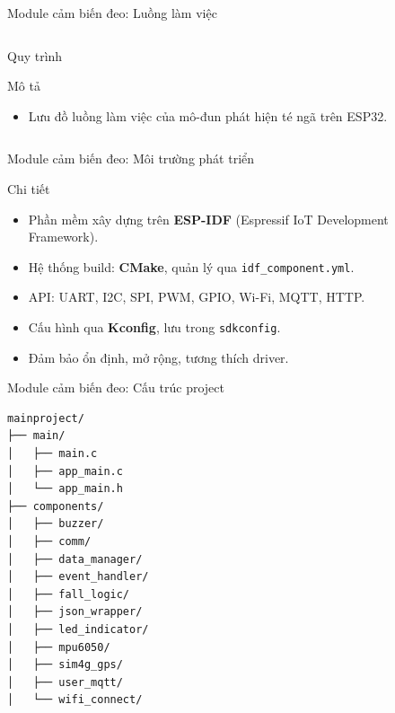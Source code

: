 \begin{frame}[fragile]{Module cảm biến đeo: Luồng làm việc}
\begin{columns}[t]
\begin{column}{0.4\textwidth}
\begin{block}{Quy trình}
\begin{itemize}
                \end{itemize}
            \end{block}
            \begin{block}{Mô tả}
                \begin{itemize}
                    \item Lưu đồ luồng làm việc của mô-đun phát hiện té ngã trên ESP32.
                \end{itemize}
            \end{block}
            \label{fig:module1_flow}
        \end{column}
    \end{columns}
\end{frame}


\begin{frame}{Module cảm biến đeo: Môi trường phát triển}
    \begin{block}{Chi tiết}
        \begin{itemize}
            \item Phần mềm xây dựng trên \textbf{ESP-IDF} (Espressif IoT Development Framework).
            \item Hệ thống build: \textbf{CMake}, quản lý qua \texttt{idf\_component.yml}.
            \item API: UART, I2C, SPI, PWM, GPIO, Wi-Fi, MQTT, HTTP.
            \item Cấu hình qua \textbf{Kconfig}, lưu trong \texttt{sdkconfig}.
            \item Đảm bảo ổn định, mở rộng, tương thích driver.
        \end{itemize}
    \end{block}
\end{frame}

\begin{frame}[fragile]{Module cảm biến đeo: Cấu trúc project}
    \renewcommand{\baselinestretch}{0.8}
    \begin{verbatim}
mainproject/
├── main/
│   ├── main.c
│   ├── app_main.c
│   └── app_main.h
├── components/
│   ├── buzzer/
│   ├── comm/
│   ├── data_manager/
│   ├── event_handler/
│   ├── fall_logic/
│   ├── json_wrapper/
│   ├── led_indicator/
│   ├── mpu6050/
│   ├── sim4g_gps/
│   ├── user_mqtt/
│   └── wifi_connect/
    \end{verbatim}
    \renewcommand{\baselinestretch}{1.0}
\end{frame}


